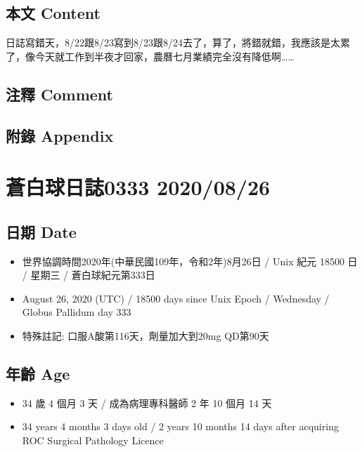 \documentclass[a5paper, 11pt
]{book}
\providecommand{\tightlist}{%
  \setlength{\itemsep}{0pt}\setlength{\parskip}{0pt}}
\begin{document}
\hypertarget{ux672cux6587-content-85}{%
\subsection{本文 Content}\label{ux672cux6587-content-85}}

日誌寫錯天，8/22跟8/23寫到8/23跟8/24去了，算了，將錯就錯，我應該是太累了，像今天就工作到半夜才回家，農曆七月業績完全沒有降低啊\ldots\ldots{}

\hypertarget{ux6ce8ux91cb-comment-85}{%
\subsection{注釋 Comment}\label{ux6ce8ux91cb-comment-85}}

\hypertarget{ux9644ux9304-appendix-85}{%
\subsection{附錄 Appendix}\label{ux9644ux9304-appendix-85}}

\hypertarget{ux84bcux767dux7403ux65e5ux8a8c0333-20200826}{%
\section{蒼白球日誌0333
2020/08/26}\label{ux84bcux767dux7403ux65e5ux8a8c0333-20200826}}

\hypertarget{ux65e5ux671f-date-86}{%
\subsection{日期 Date}\label{ux65e5ux671f-date-86}}

\begin{itemize}
\tightlist
\item
  世界協調時間2020年(中華民國109年，令和2年)8月26日 / Unix 紀元 18500 日
  / 星期三 / 蒼白球紀元第333日
\item
  August 26, 2020 (UTC) / 18500 days since Unix Epoch / Wednesday /
  Globus Pallidum day 333
\item
  特殊註記: 口服A酸第116天，劑量加大到20mg QD第90天
\end{itemize}

\hypertarget{ux5e74ux9f61-age-86}{%
\subsection{年齡 Age}\label{ux5e74ux9f61-age-86}}

\begin{itemize}
\tightlist
\item
  34 歲 4 個月 3 天 / 成為病理專科醫師 2 年 10 個月 14 天
\item
  34 years 4 months 3 days old / 2 years 10 months 14 days after
  acquiring ROC Surgical Pathology Licence
\end{itemize}
\end{document}
